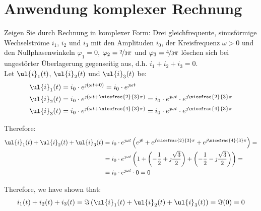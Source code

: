 \section{Anwendung komplexer Rechnung}


\begin{ejercicio}

    Zeigen Sie durch Rechnung in komplexer Form: Drei gleichfrequente, sinusförmige Wechselströme $i_1$, $i_2$ und $i_3$ mit den Amplituden $i_0$, der Kreisfrequenz $\omega > 0$ und den Nullphasenwinkeln $\varphi_1 = 0$, $\varphi_2 = \nicefrac{2}{3} \pi$ und $\varphi_3 = \nicefrac{4}{3} \pi$ löschen sich bei ungestörter Überlagerung gegenseitig aus, d.h. $i_1 + i_2 + i_3 = 0$.\\

    Let $\ul{i}_1(t)$, $\ul{i}_2(t)$ und $\ul{i}_3(t)$ be:
    \begin{align*}
        \ul{i}_1(t) &= i_0 \cdot e^{\jmath(\omega t + 0)} = i_0 \cdot e^{\jmath \omega t} \\
        \ul{i}_2(t) &= i_0 \cdot e^{\jmath(\omega t + \nicefrac{2}{3} \pi)} = i_0 \cdot e^{\jmath \omega t} \cdot e^{\jmath \nicefrac{2}{3} \pi} \\
        \ul{i}_3(t) &= i_0 \cdot e^{\jmath(\omega t + \nicefrac{4}{3} \pi)} = i_0 \cdot e^{\jmath \omega t} \cdot e^{\jmath \nicefrac{4}{3} \pi}
    \end{align*}

    Therefore:
    \begin{align*}
        \ul{i}_1(t) + \ul{i}_2(t) + \ul{i}_3(t) &= i_0 \cdot e^{\jmath \omega t} \left(e^{\jmath 0} + e^{\jmath \nicefrac{2}{3} \pi} + e^{\jmath \nicefrac{4}{3} \pi}\right)
        =\\&= i_0 \cdot e^{\jmath \omega t} \left(1 + \left(-\frac{1}{2} + \jmath \frac{\sqrt{3}}{2}\right) + \left(-\frac{1}{2} - \jmath \frac{\sqrt{3}}{2}\right)\right)
        =\\&= i_0 \cdot e^{\jmath \omega t} \cdot 0 = 0
    \end{align*}

    Therefore, we have shown that:
    \[
        i_1(t) + i_2(t) + i_3(t) = \Im\left(\ul{i}_1(t) + \ul{i}_2(t) + \ul{i}_3(t)\right) = \Im(0) = 0
    \]
\end{ejercicio}

